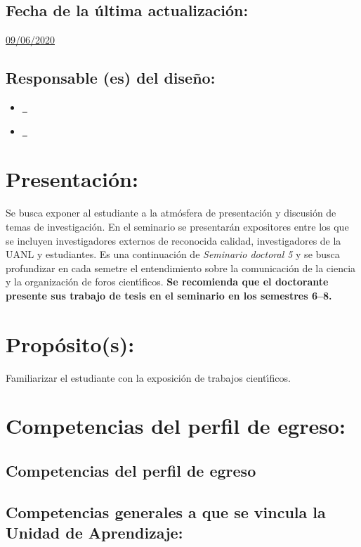 \documentclass[10 pt]{article}
\begin{document}
\subsection{Fecha de la \'{u}ltima actualizaci\'{o}n:} \underline{09/06/2020}
\subsection{Responsable (es) del dise\~{n}o:}
\begin{itemize}[label={}]
\item \underline{\ncesar~\cesar}
\item \underline{\nelisa~\elisa}
\end{itemize}
\newpage
\section{Presentaci\'{o}n:}

Se busca exponer al estudiante a la atm\'{o}sfera de presentaci\'{o}n y
discusi\'{o}n de temas de investigaci\'{o}n. En el seminario se presentar\'{a}n
expositores entre los que se incluyen investigadores externos de
reconocida calidad, investigadores de la UANL y estudiantes. Es una
continuaci\'{o}n de {\em Seminario doctoral 5} y se busca profundizar en
cada semetre el entendimiento sobre la comunicaci\'{o}n de la ciencia y la
organizaci\'{o}n de foros cient\'{\i}ficos. {\bf Se recomienda que el
  doctorante presente sus trabajo de tesis en el seminario en los
  semestres 6--8.}


\section{Prop\'{o}sito(s):}

Familiarizar el estudiante con la exposici\'{o}n de trabajos cient\'{\i}ficos.


\section{Competencias del perfil de egreso:}
\subsection{Competencias del perfil de egreso}






  
\subsection{Competencias generales a que se vincula la Unidad de
    Aprendizaje:}
\end{document}
